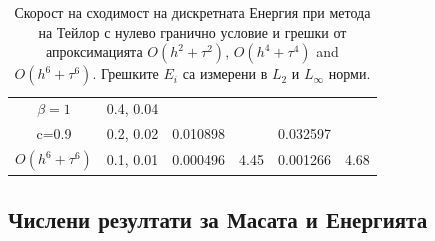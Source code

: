 \documentclass{article}
\begin{document}
\begin{table}[ht]
\begin{tabular}{||c|l|ll|ll||}
  $\beta=1$     &0.4, 0.04   &            &          &                  &      \\
      c=0.9                    &0.2, 0.02   &0.010898 &           & 0.032597      &       \\
     $O(h^6+ \tau^6)$ &0.1, 0.01 & 0.000496 &4.45 & 0.001266  & 4.68        \\
	   \hline
			\hline 
		\end{tabular}
		\caption{Скорост на сходимост на дискретната Енергия при метода на Тейлор с нулево гранично условие и грешки от апроксимацията $O(h^{2} + \tau^2 )$, $O(h^{4} + \tau^4 )$ and $O(h^{6} + \tau^6 )$. Грешките $E_i$ са измерени в $L_2$ и $L_\infty$ норми.}
\label{tableB}
\end{table}

\subsection{Числени резултати за Масата и Енергията}
\end{document}
